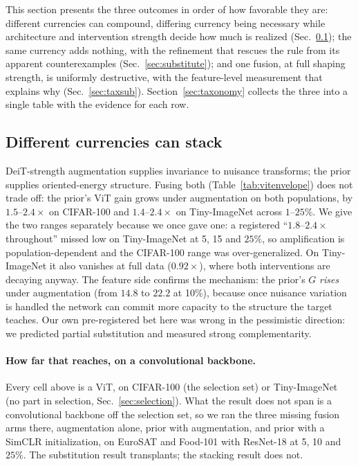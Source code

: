 This section presents the three outcomes in order of how favorable they are:
different currencies can compound, differing currency being necessary while
architecture and intervention strength decide how much is realized
(Sec.~\ref{sec:stack}); the
same currency
adds nothing, with the refinement that rescues the rule from its apparent
counterexamples (Sec.~\ref{sec:substitute}); and one fusion, at full
shaping strength, is uniformly
destructive, with the feature-level measurement that explains why
(Sec.~\ref{sec:taxsub}). Section~\ref{sec:taxonomy} collects the three
into a single table with the evidence for each row.

\subsection{Different currencies can stack}\label{sec:stack}
DeiT-strength augmentation supplies invariance to nuisance transforms; the
prior supplies oriented-energy structure. Fusing both
(Table~\ref{tab:vitenvelope}) does not trade off: the prior's ViT gain grows
under augmentation on both populations, by $1.5$--$2.4\times$ on CIFAR-100 and
$1.4$--$2.4\times$ on Tiny-ImageNet across $1$--$25\%$. We give the two ranges
separately because we once gave one: a registered ``$1.8$--$2.4\times$
throughout'' missed low on Tiny-ImageNet at 5, 15 and $25\%$, so amplification
is population-dependent and the CIFAR-100 range was over-generalized. On
Tiny-ImageNet it also vanishes at full data ($0.92\times$), where both
interventions are decaying anyway. The feature side confirms the mechanism: the prior's $G$
\emph{rises} under augmentation (from $14.8$ to $22.2$ at 10\%), because once
nuisance variation is handled the network can commit more capacity to the
structure the target teaches. Our own pre-registered bet here was wrong in the
pessimistic direction: we predicted partial substitution and measured strong
complementarity.

\paragraph{How far that reaches, on a convolutional backbone.} Every cell
above is a ViT, on CIFAR-100 (the selection set) or Tiny-ImageNet (no part in
selection, Sec.~\ref{sec:selection}). What the result does not span is a
convolutional backbone off the selection set, so we ran the three missing
fusion arms there, augmentation alone, prior with augmentation, and prior
with a SimCLR initialization, on EuroSAT and Food-101 with ResNet-18 at 5, 10
and $25\%$. The substitution result transplants; the stacking result does
not.

